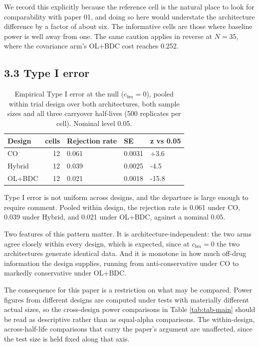 \documentclass[
  11pt,
]{article}
\begin{document}
We record this explicitly because the reference cell is the natural
place to look for comparability with paper 01, and doing so here
would understate the architecture difference by a factor of about
six. The informative cells are those where baseline power is well
away from one. The same caution applies in reverse at \(N = 35\), where
the covariance arm's OL+BDC cost reaches
0.252.

\subsection{3.3 Type I error}

\begin{table}

\caption{\label{tab:tab-type1}Empirical Type I error at the null
    ($c_{bm} = 0$), pooled within trial design over both
    architectures, both sample sizes and all three carryover
    half-lives (500 replicates per cell). Nominal level 0.05.}
\centering
\begin{tabular}[t]{lrlll}
\toprule
Design & cells & Rejection rate & SE & z vs 0.05\\
\midrule
CO & 12 & 0.061 & 0.0031 & +3.6\\
Hybrid & 12 & 0.039 & 0.0025 & -4.5\\
OL+BDC & 12 & 0.021 & 0.0018 & -15.8\\
\bottomrule
\end{tabular}
\end{table}

Type I error is not uniform across designs, and the departure is
large enough to require comment. Pooled within design, the rejection
rate is
0.061
under CO,
0.039
under Hybrid, and
0.021
under OL+BDC, against a nominal \(0.05\).

Two features of this pattern matter. It is architecture-independent:
the two arms agree closely within every design, which is expected,
since at \(c_{bm} = 0\) the two architectures generate identical data.
And it is monotone in how much off-drug information the design
supplies, running from anti-conservative under CO to markedly
conservative under OL+BDC.

The consequence for this paper is a restriction on what may be
compared. Power figures from different designs are computed under
tests with materially different actual sizes, so the cross-design
power comparisons in Table \ref{tab:tab-main} should be read as
descriptive rather than as equal-alpha comparisons. The
within-design, across-half-life comparisons that carry the paper's
argument are unaffected, since the test size is held fixed along that
axis.
\end{document}

